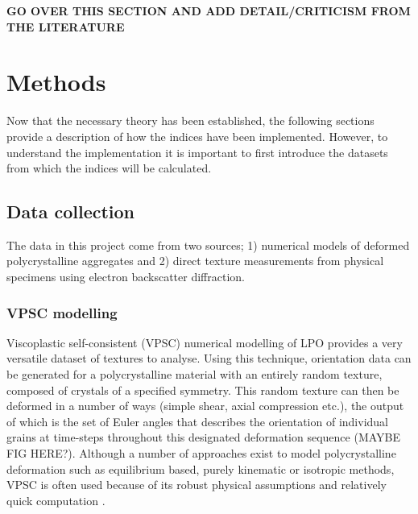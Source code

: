 \documentclass[a4paper,12pt]{report}
\numberwithin{equation}{chapter}
\begin{document}
\textbf{GO OVER THIS SECTION AND ADD DETAIL/CRITICISM FROM THE LITERATURE}

\chapter{Methods}
\vspace{-1cm}

Now that the necessary theory has been established, the following sections provide a description of how the indices have been implemented. However, to understand the implementation it is important to first introduce the datasets from which the indices will be calculated.  

\section{Data collection}
The data in this project come from two sources; 1) numerical models of deformed polycrystalline aggregates and 2) direct texture measurements from physical specimens using electron backscatter diffraction. 

\subsection{VPSC modelling}
Viscoplastic self-consistent (VPSC) numerical modelling of LPO \citep{Molinari1987,Lebensohn1993} provides a very versatile dataset of textures to analyse. Using this technique, orientation data can be generated for a polycrystalline material with an entirely random texture, composed of crystals of a specified symmetry. This random texture can then be deformed in a number of ways (simple shear, axial compression etc.), the output of which is the set of Euler angles that describes the orientation of individual grains at time-steps throughout this designated deformation sequence (MAYBE FIG HERE?). Although a number of approaches exist to model polycrystalline deformation such as equilibrium based, purely kinematic or isotropic methods, VPSC is often used because of its robust physical assumptions and relatively quick computation \citep[][and references therein]{Tommasi2000}. 
\end{document}
